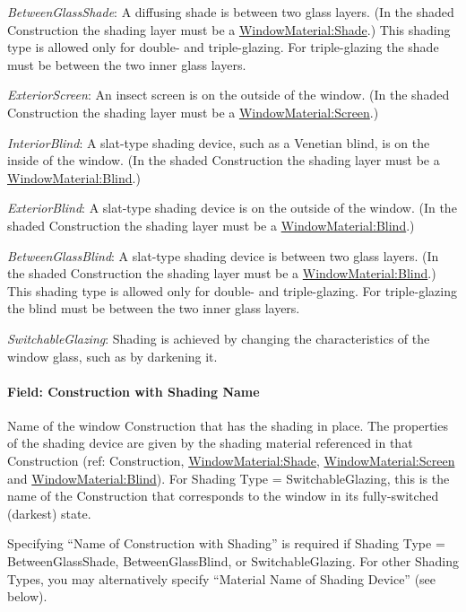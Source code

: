 \emph{BetweenGlassShade}: A diffusing shade is between two glass layers. (In the shaded Construction the shading layer must be a \hyperref[windowmaterialshade]{WindowMaterial:Shade}.) This shading type is allowed only for double- and triple-glazing. For triple-glazing the shade must be between the two inner glass layers.

\emph{ExteriorScreen}: An insect screen is on the outside of the window. (In the shaded Construction the shading layer must be a \hyperref[windowmaterialscreen]{WindowMaterial:Screen}.)

\emph{InteriorBlind}: A slat-type shading device, such as a Venetian blind, is on the inside of the window. (In the shaded Construction the shading layer must be a \hyperref[windowmaterialblind]{WindowMaterial:Blind}.)

\emph{ExteriorBlind}: A slat-type shading device is on the outside of the window. (In the shaded Construction the shading layer must be a \hyperref[windowmaterialblind]{WindowMaterial:Blind}.)

\emph{BetweenGlassBlind}: A slat-type shading device is between two glass layers. (In the shaded Construction the shading layer must be a \hyperref[windowmaterialblind]{WindowMaterial:Blind}.) This shading type is allowed only for double- and triple-glazing. For triple-glazing the blind must be between the two inner glass layers.

\emph{SwitchableGlazing}: Shading is achieved by changing the characteristics of the window glass, such as by darkening it.

\paragraph{Field: Construction with Shading Name}\label{field-construction-with-shading-name}

Name of the window Construction that has the shading in place. The properties of the shading device are given by the shading material referenced in that Construction (ref: Construction, \hyperref[windowmaterialshade]{WindowMaterial:Shade}, \hyperref[windowmaterialscreen]{WindowMaterial:Screen} and \hyperref[windowmaterialblind]{WindowMaterial:Blind}). For Shading Type = SwitchableGlazing, this is the name of the Construction that corresponds to the window in its fully-switched (darkest) state.

Specifying ``Name of Construction with Shading'' is required if Shading Type = BetweenGlassShade, BetweenGlassBlind, or SwitchableGlazing. For other Shading Types, you may alternatively specify ``Material Name of Shading Device'' (see below).

